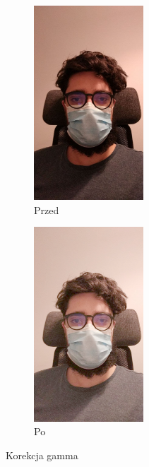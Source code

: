 \documentclass[12pt]{article}
\begin{document}
		\begin{figure}
			\centering
			\begin{subfigure}[b]{0.49\textwidth}
				\centering
				\includegraphics[width=0.45\textwidth]{nieprzerobione.jpeg}
				\caption{Przed}
				\label{fig:przed_gamma}
			\end{subfigure}
			\hfil
			\begin{subfigure}[b]{0.49\textwidth}
				\centering
				\includegraphics[width=0.45\textwidth]{po_gamma.jpeg}
				\caption{Po}
				\label{fig:po_gamma}
			\end{subfigure}
			\caption{Korekcja gamma}
		\end{figure}
\end{document}
